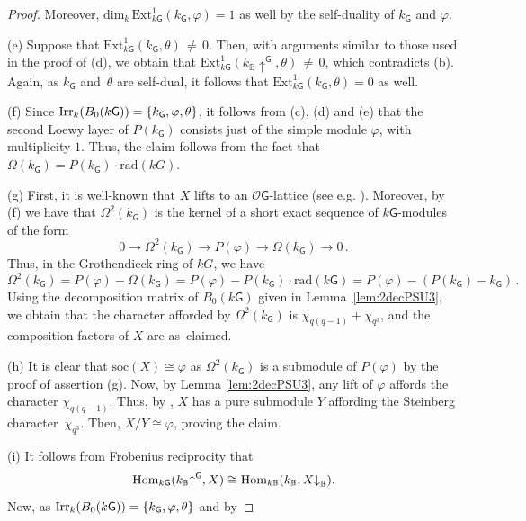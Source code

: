 \documentclass[12pt,a4paper]{amsart}
\theoremstyle{plain}\newtheorem{Theorem}{Theorem}[section]
\theoremstyle{plain}\newtheorem{Conjecture}[Theorem]{Conjecture}
\theoremstyle{plain}\newtheorem{Corollary}[Theorem]{Corollary}
\theoremstyle{plain}\newtheorem{Lemma}[Theorem]{Lemma}
\theoremstyle{plain}\newtheorem{Proposition}[Theorem]{Proposition}
\theoremstyle{definition}\newtheorem{Definition}[Theorem]{Definition}
\theoremstyle{definition}\newtheorem{Example}[Theorem]{Example}
\theoremstyle{definition}\newtheorem{Examples}[Theorem]{Examples}
\theoremstyle{definition}\newtheorem{Remark}[Theorem]{Remark}
\theoremstyle{definition}\newtheorem{Question}[Theorem]{Question}
\theoremstyle{definition}\newtheorem{Notation}[Theorem]{Notation}
\theoremstyle{definition}\newtheorem{Hypothesis}[Theorem]{Hypothesis}
\theoremstyle{definition}\newtheorem{Assumption}[Theorem]{Assumption}
\theoremstyle{definition}\newtheorem{Strategy}[Theorem]{Strategy}
\theoremstyle{definition}\newtheorem{Contents}[Theorem]{Contents}
\theoremstyle{definition}\newtheorem{Computations}[Theorem]{Computations}
\theoremstyle{definition}\newtheorem{Equivalences}[Theorem]{Equivalences}
\theoremstyle{definition}\newtheorem{Notation/Definition}[Theorem]{Notation/Definition}
\theoremstyle{definition}\newtheorem{noth}[Theorem]{}
\theoremstyle{plain}\newtheorem{Step}[Theorem]{Step}
\def\rad{\mathrm{rad}}
\def\dim{\mathrm{dim}}
\def\Ext{\mathrm{Ext}}
\def\soc{\mathrm{soc}} \def\tenOS{\otimes_{\mathcal{O}S}} \def\Tr{\mathrm{Tr}}
\begin{document}
\begin{proof}
Moreover, $\dim_k\,\Ext_{k\mathsf{G}}^1(k_\mathsf{G},\varphi)=1$ 
as well  by the self-duality \smallskip of $k_{\mathsf{G}}$ and $\varphi$.
\par
(e) 
Suppose that $\Ext_{k\mathsf{G}}^1(k_\mathsf{G},\theta)\,{\not=}\,0$. 
Then, with arguments similar to those used  in the proof of (d), we obtain that 
$\Ext_{k\mathsf{G}}^1(k_{\mathbb B}{\uparrow}^\mathsf{G},\theta)\,{\not=}\,0$, 
which contradicts (b). 
Again, as $k_{\mathsf{G}}$ and~$\theta$ are self-dual, it follows that 
$\Ext_{k\mathsf{G}}^1(k_\mathsf{G},\theta)=0$ \smallskip as well. 
\par
(f)
Since $\mathrm{Irr}_{k}(B_{0}(k\mathsf{G}))=\{k_\mathsf{G}, \varphi, \theta\}$, 
it follows from (c), (d) and (e) that the second Loewy layer of $P(k_{\mathsf{G}})$ 
consists just of the simple module $\varphi$, with multiplicity $1$. 
Thus, the claim follows from the fact that \smallskip 
$\Omega(k_\mathsf{G})=P(k_\mathsf{G}){\cdot}{\rad}(kG)$.  
\par
(g)
First, it is well-known that  $X$ lifts to an $\mathcal O\mathsf{G}$-lattice 
(see e.g. \cite[\S7.3]{Las23}).
Moreover, by (f) we have that  $\Omega^2(k_\mathsf{G})$ is the kernel of a 
short exact sequence of $k\mathsf{G}$-modules of the form
$$
0 \rightarrow\Omega^2(k_\mathsf{G}) \rightarrow P(\varphi)\rightarrow\Omega(k_\mathsf{G})\rightarrow 0\,.
$$
Thus, in the Grothendieck ring of $kG$, we have
$$
\Omega^2(k_\mathsf{G}) = P(\varphi)-\Omega(k_\mathsf{G}) = P(\varphi)-P(k_\mathsf{G}){\cdot}\rad(k\mathsf{G}) 
= P(\varphi)-( P(k_\mathsf{G})-k_\mathsf{G})\,.
$$
Using the decomposition matrix of $B_{0}(k\mathsf{G})$ given in Lemma~\ref{lem:2decPSU3}, 
we obtain that the character afforded by $\Omega^2(k_\mathsf{G})$ is  $\chi_{q(q-1)}+\chi_{q^3}$,  
 and the composition factors of $X$ \smallskip are as~claimed.
 \par
(h)
It is clear that $\soc(X)\cong\varphi$ as $\Omega^{2}(k_\mathsf{G})$ is a submodule 
of $P(\varphi)$ by  the proof of assertion (g).
Now, by Lemma \ref{lem:2decPSU3}, any lift of $\varphi$ affords the 
character $\chi_{q(q-1)}$. Thus, 
by \cite[I Theorem 17.3]{Lan83}, $X$ has a pure submodule $Y$ affording the 
Steinberg character~$\chi_{q^{3}}$.
Then, $X/Y\cong \varphi$, proving \smallskip the claim.
\par
(i) It follows from Frobenius reciprocity that
$$
\mathrm{Hom}_{k\mathsf{G}}(k_{\mathbb B}{\uparrow}^\mathsf{G}, X) 
\cong \mathrm{Hom}_{k\mathbb B}(k_{\mathbb B}, X{\downarrow}_{\mathbb B}).
$$
Now, as  $\mathrm{Irr}_{k}(B_0(k\mathsf{G}))=\{k_{\mathsf{G}},\varphi,\theta\}$ and by 

\end{proof}
\end{document}
